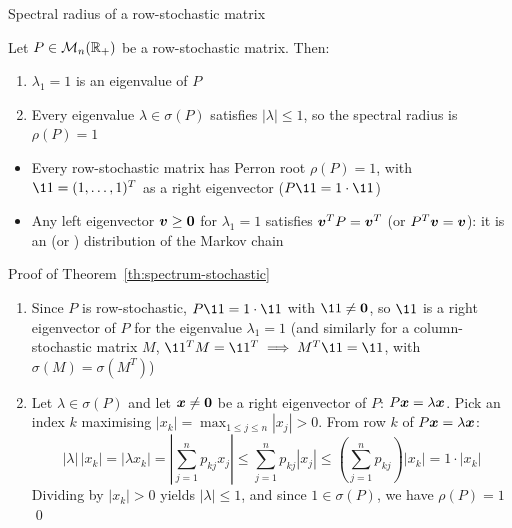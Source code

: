 \documentclass[aspectratio=169]{beamer}\usepackage[]{graphicx}\usepackage[]{xcolor}
\begin{document}
\begin{frame}{Spectral radius of a row-stochastic matrix}
\begin{importanttheorem}
\label{th:spectrum-stochastic}
Let $P \in \mathcal{M}_n(\mathbb{R}_+)$ be a row-stochastic matrix. Then:
\begin{enumerate}
\item $\lambda_1 = 1$ is an eigenvalue of $P$
\item Every eigenvalue $\lambda \in \sigma(P)$ satisfies $|\lambda| \le 1$, so the spectral radius is $\rho(P) = 1$
\end{enumerate}
\end{importanttheorem}
\vfill
\begin{itemize}
\item Every row-stochastic matrix has Perron root $\rho(P) = 1$, with $\11 = (1, \ldots, 1)^T$ as a right eigenvector ($P\11 = 1 \cdot \11$)
\item Any left eigenvector $\bv \ge \b0$ for $\lambda_1 = 1$ satisfies $\bm{v}^T P = \bm{v}^T$ (or $P^T\bm{v} = \bm{v}$): it is an  (or ) distribution of the Markov chain
\end{itemize}
\end{frame}

\begin{frame}{Proof of Theorem~\ref{th:spectrum-stochastic}}
\begin{enumerate}
\item Since $P$ is row-stochastic, $P\11 = 1 \cdot \11$ with $\11 \neq \b0$, so $\11$ is a right eigenvector of $P$ for the eigenvalue $\lambda_1 = 1$ (and similarly for a column-stochastic matrix $M$, $\11^T M = \11^T \implies M^T\11 = \11$, with $\sigma(M) = \sigma(M^T)$)
\vfill
\item Let $\lambda \in \sigma(P)$ and let $\bx \neq \b0$ be a right eigenvector of $P$: $P\bm{x} = \lambda \bm{x}$. Pick an index $k$ maximising $|x_k| = \max_{1 \le j \le n} |x_j| > 0$. From row $k$ of $P\bm{x} = \lambda \bm{x}$:
\[
|\lambda|\, |x_k| = |\lambda x_k| = \left|\sum_{j=1}^n p_{kj} x_j\right| \le \sum_{j=1}^n p_{kj} |x_j| \le \left(\sum_{j=1}^n p_{kj}\right) |x_k| = 1 \cdot |x_k|
\]
Dividing by $|x_k| > 0$ yields $|\lambda| \le 1$, and since $1 \in \sigma(P)$, we have $\rho(P) = 1$ \qed
\end{enumerate}
\end{frame}


\end{document}
